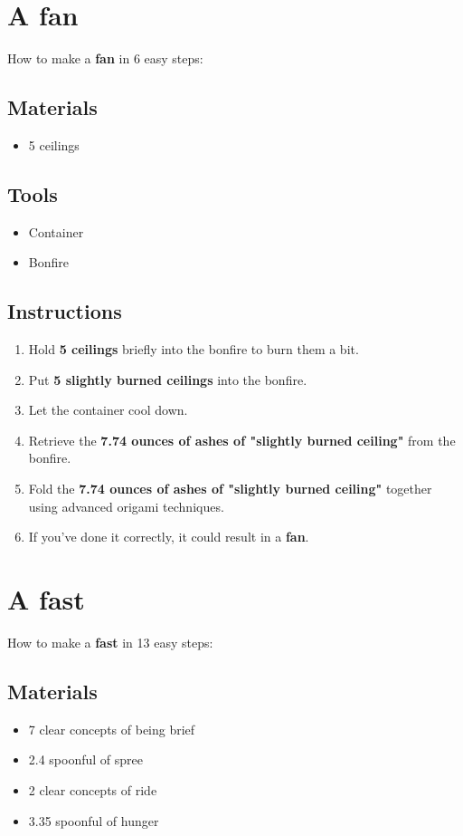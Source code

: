 \documentclass{article}
\begin{document}
\section{A fan}How to make a \textbf{fan} in 6 easy steps:

\subsection{Materials}\begin{itemize}
\item 
5 ceilings
\end{itemize}
\subsection{Tools}\begin{itemize}
\item 
Container
\item 
Bonfire
\end{itemize}
\subsection{Instructions}\begin{enumerate}
\item 
Hold \textbf{5 ceilings} briefly into the bonfire to burn them a bit.
\item 
Put \textbf{5 slightly burned ceilings} into the bonfire.
\item 
Let the container cool down.
\item 
Retrieve the \textbf{7.74 ounces of ashes of "slightly burned ceiling"} from the bonfire.
\item 
Fold the \textbf{7.74 ounces of ashes of "slightly burned ceiling"} together using advanced origami techniques.
\item 
If you've done it correctly, it could result in a \textbf{fan}.
\end{enumerate}
\newpage
\section{A fast}How to make a \textbf{fast} in 13 easy steps:

\subsection{Materials}\begin{itemize}
\item 
7 clear concepts of being brief
\item 
2.4 spoonful of spree
\item 
2 clear concepts of ride
\item 
3.35 spoonful of hunger
\end{itemize}
\end{document}
